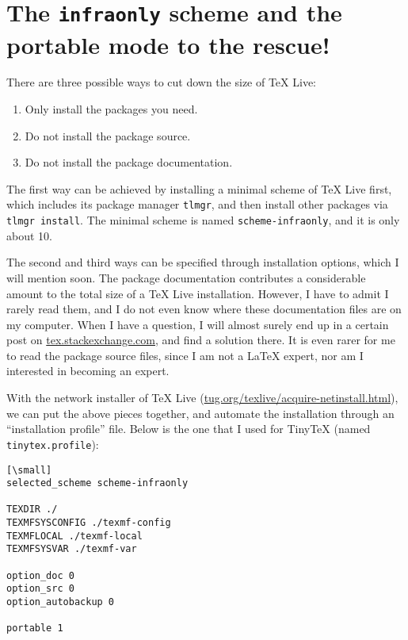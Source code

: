\documentclass{tugboat}
\begin{document}
\hypertarget{the-infraonly-scheme-and-the-portable-mode-to-the-rescue}{%
\section{\texorpdfstring{The \texttt{infraonly} scheme and the portable
mode to the
rescue!}{The infraonly scheme and the portable mode to the rescue!}}\label{the-infraonly-scheme-and-the-portable-mode-to-the-rescue}}

There are three possible ways to cut down the size of \TeX{} Live:

\begin{enumerate}
\def\labelenumi{\arabic{enumi}.}
\item
  Only install the packages you need.
\item
  Do not install the package source.
\item
  Do not install the package documentation.
\end{enumerate}

The first way can be achieved by installing a minimal scheme of \TeX{} Live
first, which includes its package manager \texttt{tlmgr}, and then
install other packages via \texttt{tlmgr\ install}. The minimal scheme
is named \texttt{scheme-infraonly}, and it is only about 10.

The second and third ways can be specified through installation options,
which I will mention soon. The package documentation contributes a
considerable amount to the total size of a \TeX{} Live installation.
However, I have to admit I rarely read them, and I do not even know
where these documentation files are on my computer. When I have a
question, I will almost surely end up in a certain post on
\url{tex.stackexchange.com}, and find a solution there. It is
even rarer for me to read the package source files, since I am not a
\LaTeX{} expert, nor am I interested in becoming an expert.

With the network installer of \TeX{} Live
(\url{tug.org/texlive/acquire-netinstall.html}), we can put the
above pieces together, and automate the installation through an
``installation profile'' file. Below is the one that I used for TinyTeX
(named \texttt{tinytex.profile}):

\begin{verbatim}[\small]
selected_scheme scheme-infraonly

TEXDIR ./
TEXMFSYSCONFIG ./texmf-config
TEXMFLOCAL ./texmf-local
TEXMFSYSVAR ./texmf-var

option_doc 0
option_src 0
option_autobackup 0

portable 1
\end{verbatim}
\end{document}
